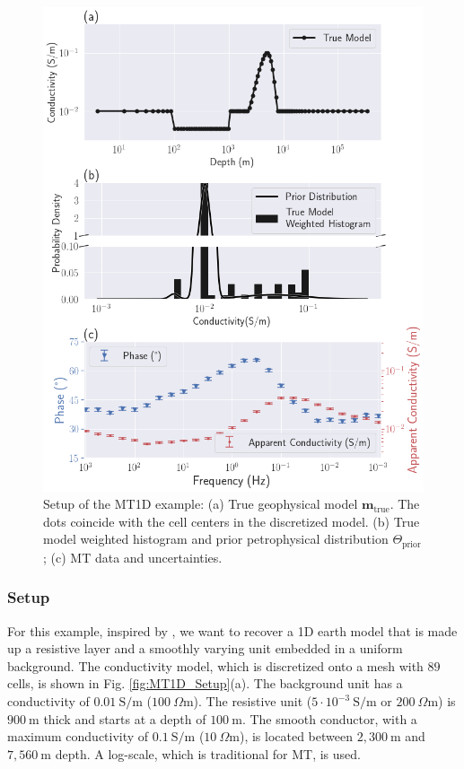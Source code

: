 \documentclass[extra]{gji} %
\begin{document}
\begin{figure}
 \centering
 \includegraphics[width=\columnwidth]{./Fig/LowRes/MT1D_Setup.png}
 \caption[]{Setup of the MT1D example: (a) True geophysical model $\mathbf{m}_{\text{true}}$. The dots coincide with the cell centers in the discretized model. (b) True model weighted histogram and prior petrophysical distribution $\Theta_{\text{prior}}$; (c) MT data and uncertainties.}
 \label{Fig/LowRes/MT1D_Setup}
\end{figure}

\subsubsection{Setup}

For this example, inspired by \cite{tle-MT1D}, we want to recover a 1D earth model that is made up a resistive layer and a smoothly varying unit embedded in a uniform background. The conductivity model, which is discretized onto a mesh with $89$ cells, is shown in Fig. \ref{fig:MT1D_Setup}(a). The background unit has a conductivity of $0.01~\text{S/m}$ ($100~\Omega \text{m}$). The resistive unit ($5\cdot10^{-3}~\text{S/m}$ or $200~\Omega \text{m}$) is $900~\text{m}$ thick and starts at a depth of $100~\text{m}$. The smooth conductor, with a maximum conductivity of $0.1~\text{S/m}$ ($10~\Omega \text{m}$), is located between $2,300~\text{m}$ and $7,560~\text{m}$ depth. A log-scale, which is traditional for MT, is used.
\end{document}
